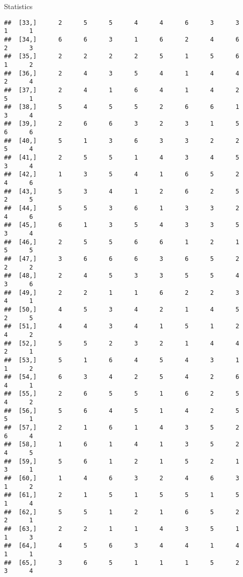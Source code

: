 \documentclass[
  ignorenonframetext,
]{beamer}
\begin{document}
\begin{frame}[fragile]{Statistics}
\begin{verbatim}
##  [33,]      2      5      5      4      4      6      3      3      1      1
##  [34,]      6      6      3      1      6      2      4      6      2      3
##  [35,]      2      2      2      2      5      1      5      6      1      2
##  [36,]      2      4      3      5      4      1      4      4      2      4
##  [37,]      2      4      1      6      4      1      4      2      5      1
##  [38,]      5      4      5      5      2      6      6      1      3      4
##  [39,]      2      6      6      3      2      3      1      5      6      6
##  [40,]      5      1      3      6      3      3      2      2      5      4
##  [41,]      2      5      5      1      4      3      4      5      3      4
##  [42,]      1      3      5      4      1      6      5      2      4      6
##  [43,]      5      3      4      1      2      6      2      5      2      5
##  [44,]      5      5      3      6      1      3      3      2      4      6
##  [45,]      6      1      3      5      4      3      3      5      3      4
##  [46,]      2      5      5      6      6      1      2      1      5      5
##  [47,]      3      6      6      6      3      6      5      2      2      2
##  [48,]      2      4      5      3      3      5      5      4      3      6
##  [49,]      2      2      1      1      6      2      2      3      4      1
##  [50,]      4      5      3      4      2      1      4      5      2      5
##  [51,]      4      4      3      4      1      5      1      2      4      2
##  [52,]      5      5      2      3      2      1      4      4      2      1
##  [53,]      5      1      6      4      5      4      3      1      1      2
##  [54,]      6      3      4      2      5      4      2      6      4      1
##  [55,]      2      6      5      5      1      6      2      5      4      2
##  [56,]      5      6      4      5      1      4      2      5      5      1
##  [57,]      2      1      6      1      4      3      5      2      6      4
##  [58,]      1      6      1      4      1      3      5      2      4      5
##  [59,]      5      6      1      2      1      5      2      1      3      1
##  [60,]      1      4      6      3      2      4      6      3      1      2
##  [61,]      2      1      5      1      5      5      1      5      1      4
##  [62,]      5      5      1      2      1      6      5      2      2      1
##  [63,]      2      2      1      1      4      3      5      1      1      3
##  [64,]      4      5      6      3      4      4      1      4      1      1
##  [65,]      3      6      5      1      1      1      5      2      3      4

\end{verbatim}
\end{frame}
\end{document}
